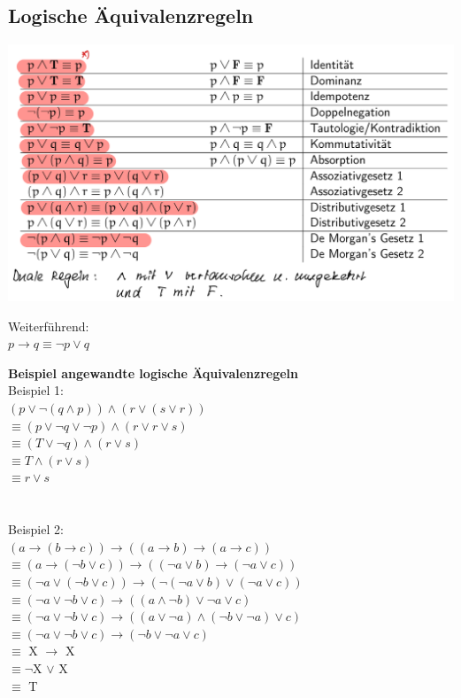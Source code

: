 \documentclass[12pt]{scrartcl}
\begin{document}
\subsection{Logische Äquivalenzregeln}
\includegraphics[width=14cm]{img/logic_equivalence_rules.png}

Weiterführend:\\
$p \rightarrow q \equiv \lnot p \lor q$


\newpage
\textbf{Beispiel angewandte logische Äquivalenzregeln}\\
Beispiel 1:\\
$\left(p \lor \lnot(q \land p)\right) \land \left(r \lor (s \lor r)\right)$\\
$\equiv (p \lor \lnot q \lor \lnot p) \land (r \lor r \lor s)$\\
$\equiv (T \lor \lnot q) \land (r \lor s)$\\
$\equiv T \land (r \lor s)$\\
$\equiv r \lor s$
 \\
 \\
 \\

Beispiel 2:\\
$(a \rightarrow (b \rightarrow c)) \rightarrow ((a \rightarrow b)\rightarrow (a \rightarrow c))$\\
$\equiv (a \rightarrow (\lnot b \lor c)) \rightarrow ((\lnot a \lor b) \rightarrow (\lnot a \lor c))$\\
$\equiv (\lnot a \lor (\lnot b \lor c)) \rightarrow (\lnot(\lnot a \lor b) \lor (\lnot a \lor c))$\\
$\equiv (\lnot a \lor \lnot b \lor c) \rightarrow ((a \land \lnot b) \lor \lnot a \lor c)$\\
$\equiv (\lnot a \lor \lnot b \lor c) \rightarrow ((a \lor \lnot a) \land (\lnot b \lor \lnot a) \lor c)$\\
$\equiv (\lnot a \lor \lnot b \lor c) \rightarrow (\lnot b \lor \lnot a \lor c)$\\
$\equiv$ X $\rightarrow$ X\\
$\equiv \lnot$X $\lor$ X\\
$\equiv$ T\\
\end{document}
